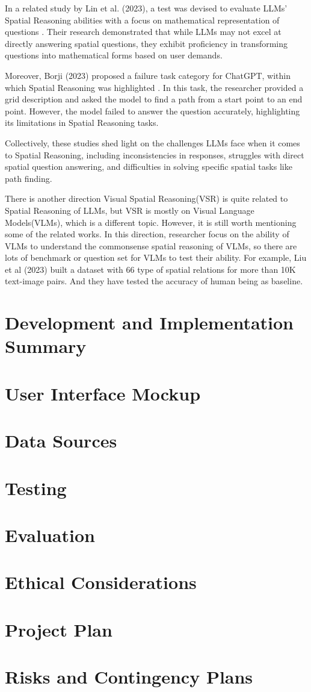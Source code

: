 \documentclass[journal,10pt]{IEEEtran}
\begin{document}
In a related study by Lin et al. (2023), a test was devised to evaluate LLMs' Spatial Reasoning abilities with a focus on mathematical representation of questions \cite{lin2023using}. Their research demonstrated that while LLMs may not excel at directly answering spatial questions, they exhibit proficiency in transforming questions into mathematical forms based on user demands.

Moreover, Borji (2023) proposed a failure task category for ChatGPT, within which Spatial Reasoning was highlighted \cite{borji2023categorical}. In this task, the researcher provided a grid description and asked the model to find a path from a start point to an end point. However, the model failed to answer the question accurately, highlighting its limitations in Spatial Reasoning tasks.

Collectively, these studies shed light on the challenges LLMs face when it comes to Spatial Reasoning, including inconsistencies in responses, struggles with direct spatial question answering, and difficulties in solving specific spatial tasks like path finding. 

There is another direction Visual Spatial Reasoning(VSR) is quite related to Spatial Reasoning of LLMs, but VSR is mostly on Visual Language Models(VLMs), which is a different topic. However, it is still worth mentioning some of the related works. In this direction, researcher focus on the ability of VLMs to understand the commonsense spatial reasoning of VLMs, so there are lots of benchmark or question set for VLMs to test their ability. For example, Liu et al (2023) \cite{liu2022visual} built a dataset with 66 type of spatial relations for more than 10K text-image pairs. And they have tested the accuracy of human being as baseline.

\section{Development and Implementation Summary}
\section{User Interface Mockup}
\section{Data Sources}
\section{Testing}
\section{Evaluation}
\section{Ethical Considerations}
\section{Project Plan}
\section{Risks and Contingency Plans}



\end{document}
